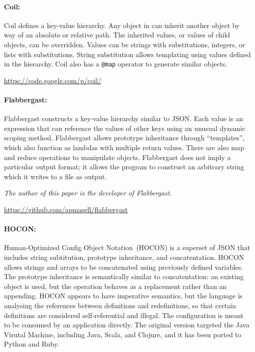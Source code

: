 \documentclass[letterpaper,twocolumn,10pt]{article}
\begin{document}
\paragraph{Coil:}
Coil defines a key-value hierarchy. Any object in can inherit another object by way of an absolute or relative path. The inherited values, or values of child objects, can be overridden. Values can be strings with substitutions, integers, or lists with substitutions. String substitution allows templating using values defined in the hierarchy. Coil also has a \texttt{@map} operator to generate similar objects.

\noindent \url{https://code.google.com/p/coil/}

\paragraph{Flabbergast:}
Flabbergast constructs a key-value hierarchy similar to JSON. Each value is an expression that can reference the values of other keys using an unusual dynamic scoping method. Flabbergast allows prototype inheritance through ``templates'', which also function as lambdas with multiple return values. There are also map and reduce operations to manipulate objects. Flabbergast does not imply a particular output format; it allows the program to construct an arbitrary string which it writes to a file as output.

\noindent\emph{The author of this paper is the developer of Flabbergast.}

\noindent \url{https://github.com/apmasell/flabbergast}

\paragraph{HOCON:}
Human-Optimized Config Object Notation~(HOCON) is a superset of JSON that includes string subtitution, prototype inheritance, and concatentation. HOCON allows strings and arrays to be concatenated using previously defined variables. The prototype inheritance is semantically similar to concatentation: an existing object is used, but the operation behaves as a replacement rather than an appending. HOCON appears to have imperative semantics, but the language is analysing the references between definitions and redefinitions, so that certain definitions are considered self-referential and illegal. The configuration is meant to be consumed by an application directly. The original version targeted the Java Virutal Machine, including Java, Scala, and Clojure, and it has been ported to Python and Ruby.
\end{document}
